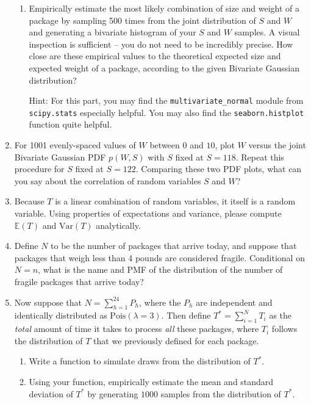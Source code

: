 \documentclass{../harvardml}
\theoremstyle{definition}
\theoremstyle{plain}
\begin{document}
\begin{problem}
\begin{enumerate}
\begin{enumerate}
        \item Empirically estimate the most likely combination of size and weight of a package by sampling 500 times from the joint distribution of $S$ and $W$ and generating a bivariate histogram of your $S$ and $W$ samples. A visual inspection is sufficient -- you do not need to be incredibly precise.  How close are these empirical values to the theoretical expected size and expected weight of a package, according to the given Bivariate Gaussian distribution?

        Hint: For this part, you may find the \texttt{multivariate\_normal} module from \texttt{scipy.stats} especially helpful. You may also find the \texttt{seaborn.histplot} function quite helpful. 
    \end{enumerate}
    
    \item For 1001 evenly-spaced values of $W$ between $0$ and $10$, plot $W$ versus the joint Bivariate Gaussian PDF $p(W, S)$ with $S$ fixed at $S=118$. Repeat this procedure for $S$ fixed at $S=122$. Comparing these two PDF plots, what can you say about the correlation of random variables $S$ and $W$? 
    
    \item Because $T$ is a linear combination of random variables, it itself is a random variable. Using properties of expectations and variance, please compute $\mathbb{E}(T)$ and $\mathrm{Var}(T)$ analytically.
    
    \item Define $N$ to be the number of packages that arrive today, and suppose that packages that weigh less than 4 pounds are considered fragile. Conditional on $N=n$, what is the name and PMF of the distribution of the number of fragile packages that arrive today?
    
    \item Now suppose that $N = \sum_{h=1}^{24}P_h$, where the $P_h$ are independent and identically distributed as $\text{Pois}(\lambda=3)$. Then define $T^* = \sum_{i=1}^{N} T_i$ as the  \textit{total} amount of time it takes to process \textit{all} these packages, where $T_i$ follows the distribution of $T$ that we previously defined for each package.
    \begin{enumerate}
        \item Write a function to simulate draws from the distribution of $T^{*}$. 
        \item Using your function, empirically estimate the mean and standard deviation of $T^{*}$ by generating $1000$ samples from the distribution of $T^{*}$.
    \end{enumerate}
\end{enumerate}
\end{problem}
\end{document}
